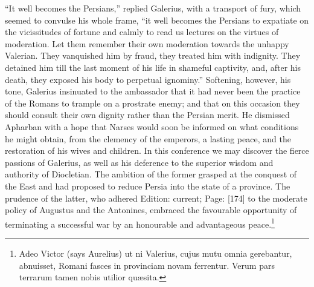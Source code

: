 \texthebrew{“}It well becomes the Persians,\texthebrew{}” replied Galerius, with a transport of fury, which seemed to convulse his whole frame, \texthebrew{“}it well becomes the Persians to expatiate on the vicissitudes of fortune and calmly to read us lectures on the virtues of moderation. Let them remember their own moderation towards the unhappy Valerian. They vanquished him by fraud, they treated him with indignity. They detained him till the last moment of his life in shameful captivity, and, after his death, they exposed his body to perpetual ignominy.\texthebrew{}” Softening, however, his tone, Galerius insinuated to the ambassador that it had never been the practice of the Romans to trample on a prostrate enemy; and that on this occasion they should consult their own dignity rather than the Persian merit. He dismissed Apharban with a hope that Narses would soon be informed on what conditions he might obtain, from the clemency of the emperors, a lasting peace, and the restoration of his wives and children. In this conference we may discover the fierce passions of Galerius, as well as his deference to the superior wisdom and authority of Diocletian. The ambition of the former grasped at the conquest of the East and had proposed to reduce Persia into the state of a province. The prudence of the latter, who adhered Edition: current; Page: [174] to the moderate policy of Augustus and the Antonines, embraced the favourable opportunity of terminating a successful war by an honourable and advantageous peace.\footnote{Adeo Victor (says Aurelius) ut ni Valerius, cujus mutu omnia gerebantur, abnuisset, Romani fasces in provinciam novam ferrentur. Verum pars terrarum tamen nobis utilior quæsita.}

